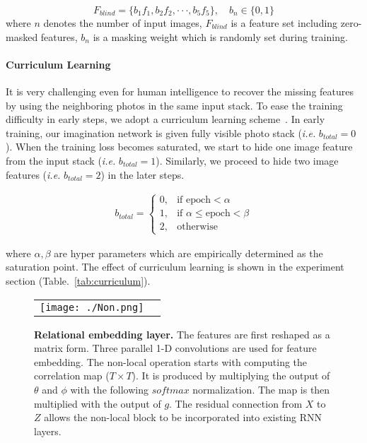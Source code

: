 \documentclass[letterpaper]{article} \usepackage{aaai20}  \usepackage{times}  \usepackage{helvet} \usepackage{courier}  \usepackage[hyphens]{url}  \usepackage{graphicx} \urlstyle{rm} \def\UrlFont{\rm}  \usepackage{graphicx}  \frenchspacing  \setlength{\pdfpagewidth}{8.5in}  \setlength{\pdfpageheight}{11in}
\newcommand{\tabref}[1]{Table.~\ref{#1}}
\newcommand{\ie}{{\it i.e. }}
\begin{document}
\begin{equation}
F_{blind} = \{ b_{1} f_{1}, b_{2} f_{2}, \cdot\cdot\cdot, b_{5} f_{5} \}, \quad b_{n} \in \{0, 1\}
\label{equ:blinding}
\end{equation}
where $n$ denotes the number of input images, $F_{blind}$ is a feature set including zero-masked features, $b_{n}$ is a masking weight which is randomly set during training.



\paragraph{Curriculum Learning}
\quad

\noindent
It is very challenging even for human intelligence to recover the missing features by using the neighboring photos in the same input stack. To ease the training difficulty in early steps, we adopt a curriculum learning scheme~\cite{bengio2009curriculum}. In early training, our imagination network is given fully visible photo stack (\ie $b_{total} = 0$). When the training loss becomes saturated, we start to hide one image feature from the input stack (\ie $b_{total} = 1$). Similarly, we proceed to hide two image features (\ie $ b_{total} = 2$) in the later steps.

\begin{eqnarray}
    b_{total} = 
\begin{cases}
0,& \text{if  } \text{epoch}  < \alpha \\
1,& \text{if  } \alpha \leq \text{epoch} < \beta \\
2,&  \text{otherwise}
\end{cases}
\label{equ:curriculum}
\end{eqnarray}

where $\alpha, \beta$ are hyper parameters which are empirically determined as the saturation point. The effect of curriculum learning is shown in the experiment section (\tabref{tab:curriculum}).


\begin{figure}[t]
\begin{center}
\def\arraystretch{1.0}
\begin{tabular}{@{}c@{\hskip 0.005\textwidth }c@{}}
\texttt{[image: ./Non.png]} \\
\end{tabular}
\end{center}
\caption{\textbf{Relational embedding layer.} The features are first reshaped as a matrix form. Three parallel 1-D convolutions are used for feature embedding. The non-local operation starts with computing the correlation map ($T \times T$). It is produced by multiplying the output of $\theta$ and $\phi$ with the following $softmax$ normalization. The map is then multiplied with the output of $g$. The residual connection from $X$ to $Z$ allows the non-local block to be incorporated into existing RNN layers.}
\label{fig:non-local}
\end{figure}
\end{document}
